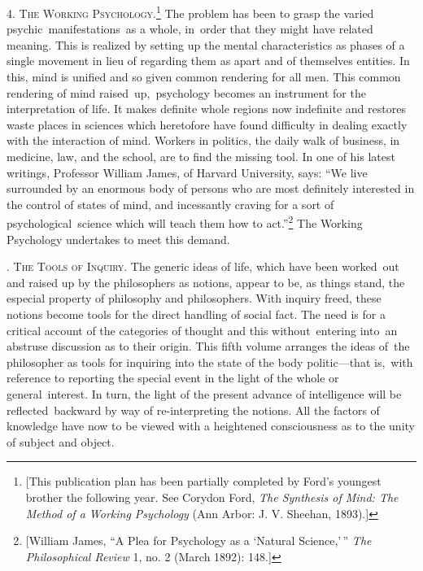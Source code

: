 \documentclass[openany,nobib]{tufte-book}
\begin{document}
\vspace{0.05in}

4. \textsc{The Working Psychology}.\footnote{{[}This publication plan has been
  partially completed by Ford's youngest brother the following year. See
  Corydon Ford, \emph{The Synthesis of Mind: The Method of a Working
  Psychology} (Ann Arbor: J. V. Sheehan, 1893).{]}} The problem has been
to grasp the varied psychic~manifestations~as a whole, in~order that
they might have related meaning. This is realized by setting up the
mental characteristics as phases of a single movement in lieu of
regarding them as apart and of themselves entities. In this, mind is
unified and so given common rendering for all men. This common rendering
of mind raised~up,~psychology becomes an instrument for the
interpretation of life. It makes definite whole regions now indefinite
and restores waste places in sciences which heretofore have found
difficulty in dealing exactly with the interaction of mind. Workers in
politics, the daily walk of business, in medicine, law, and the school,
are to find the missing tool. In one of his latest writings, Professor
William James, of Harvard University, says: ``We live surrounded by an
enormous body of persons who are most definitely interested in the
control of states of mind, and incessantly craving for a sort of
psychological~science which will teach them how to act.''\footnote{{[}William
  James, ``A Plea for Psychology as a `Natural Science,'\,'' \emph{The
  Philosophical Review} 1, no. 2 (March 1892): 148.{]}} The Working
Psychology undertakes to meet this demand.

. \textsc{The Tools of Inquiry}. The generic ideas of life, which have been
worked~out and raised up by the philosophers as notions, appear to be,
as things stand, the especial property of philosophy and philosophers.
With inquiry freed, these notions become tools for the direct handling
of social fact. The need is for a critical account of the categories of
thought and this without~entering into~an abstruse discussion as to
their origin. This fifth volume arranges the ideas of~the philosopher as
tools for inquiring into the state of the body politic---that is,~with
reference to reporting the special event in the light of the whole or
general~interest. In turn, the light of the present advance of
intelligence will be reflected~backward by way of re-interpreting the
notions. All the factors of knowledge have now to be viewed with a
heightened consciousness as to the unity of subject and object.~
\end{document}
